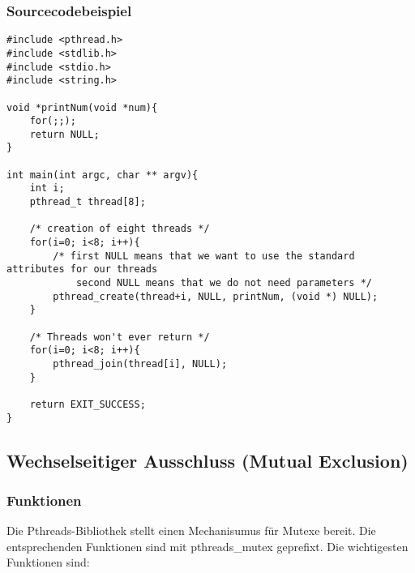 \documentclass[11pt,a4paper]{article}
\begin{document}
\subsubsection{Sourcecodebeispiel}
\begin{lstlisting}[name=Thread Management]
#include <pthread.h>
#include <stdlib.h>
#include <stdio.h>
#include <string.h>

void *printNum(void *num){
	for(;;);
	return NULL;
}

int main(int argc, char ** argv){
	int i;
	pthread_t thread[8];

	/* creation of eight threads */
	for(i=0; i<8; i++){
		/* first NULL means that we want to use the standard attributes for our threads
			second NULL means that we do not need parameters */
		pthread_create(thread+i, NULL, printNum, (void *) NULL);
	}

	/* Threads won't ever return */
	for(i=0; i<8; i++){
		pthread_join(thread[i], NULL);
	}

	return EXIT_SUCCESS;
}
\end{lstlisting}

\subsection{Wechselseitiger Ausschluss (Mutual Exclusion)}
\subsubsection{Funktionen}

Die Pthreads-Bibliothek stellt einen Mechanisumus für Mutexe bereit. Die entsprechenden Funktionen sind mit pthreads\_mutex geprefixt. 
Die wichtigesten Funktionen sind:
\end{document}
